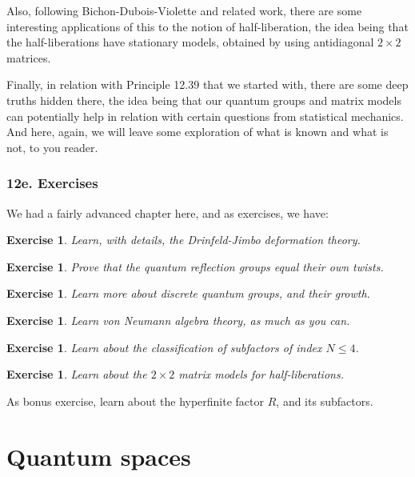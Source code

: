 \documentclass[12pt]{amsbook}
\newtheorem{exercise}[theorem]{Exercise}
\begin{document}
Also, following Bichon-Dubois-Violette \cite{bd1} and related work, there are some interesting applications of this to the notion of half-liberation, the idea being that the half-liberations have stationary models, obtained by using antidiagonal $2\times2$ matrices.

\bigskip

Finally, in relation with Principle 12.39 that we started with, there are some deep truths hidden there, the idea being that our quantum groups and matrix models can potentially help in relation with certain questions from statistical mechanics. And here, again, we will leave some exploration of what is known and what is not, to you reader.

\section*{12e. Exercises}

We had a fairly advanced chapter here, and as exercises, we have:

\begin{exercise}
Learn, with details, the Drinfeld-Jimbo deformation theory.
\end{exercise}

\begin{exercise}
Prove that the quantum reflection groups equal their own twists.
\end{exercise}

\begin{exercise}
Learn more about discrete quantum groups, and their growth.
\end{exercise}

\begin{exercise}
Learn von Neumann algebra theory, as much as you can.
\end{exercise}

\begin{exercise}
Learn about the classification of subfactors of index $N\leq4$.
\end{exercise}

\begin{exercise}
Learn about the $2\times2$ matrix models for half-liberations.
\end{exercise}

As bonus exercise, learn about the hyperfinite factor $R$, and its subfactors.

\part{Quantum spaces}
\end{document}
